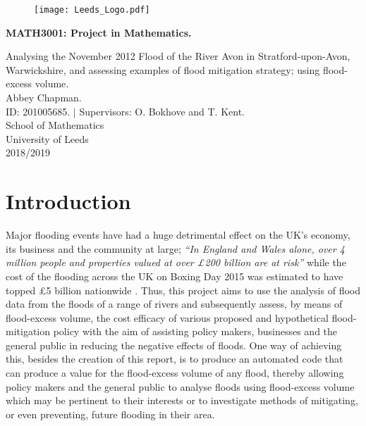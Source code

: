 \documentclass[11pt,a4paper]{article}
\begin{document}

\begin{titlepage}
\begin{center}

\begin{figure}[t]
\raggedleft
\texttt{[image: Leeds\_Logo.pdf]}
\end{figure}
 

\vspace*{5cm}
{\huge \textbf{MATH3001: Project in Mathematics.}}\\
\hrulefill

\vspace*{0.1cm}
{\LARGE Analysing the November 2012 Flood of the River Avon in Stratford-upon-Avon, Warwickshire, and assessing examples of flood mitigation strategy{;} using flood-excess volume.}\\
\vspace{1cm}
{\large Abbey Chapman.}\\
{\large ID: 201005685. $|$ Supervisors: O. Bokhove and T. Kent.}\\
\vfill
School of Mathematics\\
University of Leeds\\
2018/2019
\end{center}
\end{titlepage}

\tableofcontents 
\noindent \hrulefill

\newpage
\section{Introduction}
Major flooding events have had a huge detrimental effect on the UK's economy, its business and the community at large{;} \textit{``In England and Wales alone, over 4 million people and properties valued at over £200 billion are at risk''} \cite{foresight} while the cost of the flooding across the UK on Boxing Day 2015 was estimated to have topped \pounds5 billion nationwide \cite{telegraph}. Thus, this project aims to use the analysis of flood data from the floods of a range of rivers and subsequently assess, by means of flood-excess volume, the cost efficacy of various proposed and hypothetical flood-mitigation policy with the aim of assisting policy makers, businesses and the general public in reducing the negative effects of floods. One way of achieving this, besides the creation of this report, is to produce an automated code that can produce a value for the flood-excess volume of any flood, thereby allowing policy makers and the general public to analyse floods using flood-excess volume which may be pertinent to their interests or to investigate methods of mitigating, or even preventing, future flooding in their area.
\end{document}

